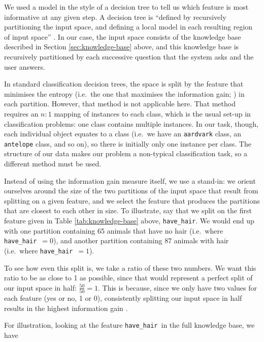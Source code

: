 \documentclass[11pt,a4paper]{article}
\newcommand{\havehair}{\texttt{have\_hair}}
\begin{document}
{We used a model in the style of a decision tree to tell us which feature is most informative at any given step.
A decision tree is ``defined by recursively partitioning the input space, and defining a local model in each resulting region of input space'' \citep[545]{Murphy2012}.
In our case, the input space consists of the knowledge base described in Section \ref{sec:knowledge-base} above, and this knowledge base is recursively partitioned by each successive question that the system asks and the user answers.

In standard classification decision trees, the space is split by the feature that minimises the entropy (i.e.\ the one that maximises the information gain; \citealt{Quinlan1986}) in each partition.
However, that method is not applicable here.
That method requires an $n : 1$ mapping of instances to each class, which is the usual set-up in classification problems: one class contains multiple instances.
In our task, though, each individual object equates to a class (i.e.\ we have an \texttt{aardvark} class, an \texttt{antelope} class, and so on), so there is initially only one instance per class.
The structure of our data makes our problem a non-typical classification task, so a different method must be used.

Instead of using the information gain measure itself, we use a stand-in: we orient ourselves around the size of the two partitions of the input space that result from splitting on a given feature, and we select the feature that produces the partitions that are closest to each other in size.
To illustrate, say that we split on the first feature given in Table \ref{tab:knowledge-base} above, \havehair.
We would end up with one partition containing 65 animals that have no hair (i.e.\ where \havehair\ $= 0$), and another partition containing 87 animals with hair (i.e.\ where \havehair\ $= 1$).

To see how even this split is, we take a ratio of these two numbers.
We want this ratio to be as close to 1 as possible, since that would represent a perfect split of our input space in half: $\frac{50}{50} = 1$.
This is because, since we only have two values for each feature (yes or no, 1 or 0), consistently splitting our input space in half results in the highest information gain \citep[cf.][]{Quinlan1986, Bishop2006}.

For illustration, looking at the feature \havehair\ in the full knowledge base, we have

}
\end{document}
